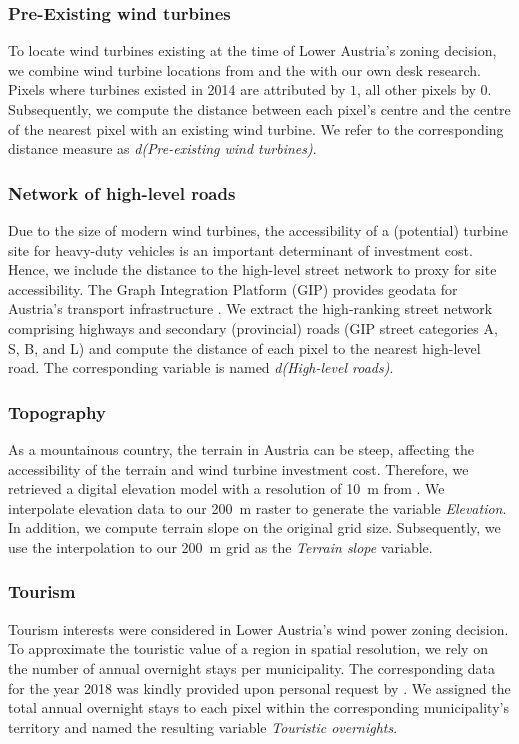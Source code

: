 \documentclass[review, a4paper, 12pt, authoryear, times]{elsarticle}
\begin{document}
\subsubsection{Pre-Existing wind turbines}
To locate wind turbines existing at the time of Lower Austria's zoning decision, we combine wind turbine locations from \cite{IGWindkraft2023} and the \cite{BEV2023} with our own desk research.
Pixels where turbines existed in 2014 are attributed by $1$, all other pixels by $0$.
Subsequently, we compute the distance between each pixel's centre and the centre of the nearest pixel with an existing wind turbine.
We refer to the corresponding distance measure as \emph{d(Pre-existing wind turbines)}.

\subsubsection{Network of high-level roads}
Due to the size of modern wind turbines, the accessibility of a (potential) turbine site for heavy-duty vehicles is an important determinant of investment cost.
Hence, we include the distance to the high-level street network to proxy for site accessibility.
The Graph Integration Platform (GIP) provides geodata for Austria's transport infrastructure .
We extract the high-ranking street network comprising highways and secondary (provincial) roads (GIP street categories A, S, B, and L) and compute the distance of each pixel to the nearest high-level road. 
The corresponding variable is named \emph{d(High-level roads)}.

\subsubsection{Topography}
As a mountainous country, the terrain in Austria can be steep, affecting the accessibility of the terrain and wind turbine investment cost.
Therefore, we retrieved a digital elevation model with a resolution of \SI{10}{\metre} from \cite{KaGIS2022}.
We interpolate elevation data to our \SI{200}{\metre} raster to generate the variable \emph{Elevation}.
In addition, we compute terrain slope on the original grid size. 
Subsequently, we use the interpolation to our \SI{200}{\metre} grid as the \emph{Terrain slope} variable.

\subsubsection{Tourism}
Tourism interests were considered in Lower Austria's wind power zoning decision. 
To approximate the touristic value of a region in spatial resolution, we rely on the number of annual overnight stays per municipality.
The corresponding data for the year 2018 was kindly provided upon personal request by \cite{StatistikAustria2022}.
We assigned the total annual overnight stays to each pixel within the corresponding municipality's territory and named the resulting variable \emph{Touristic overnights}.
\end{document}
